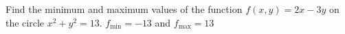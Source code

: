 {Find the minimum and maximum values of the function $f(x,y) = 2x-3y$ on the circle $x^2 + y^2 = 13$.
}
{$f_{\text{min}}=-13$ and $f_{\text{max}}=13$}